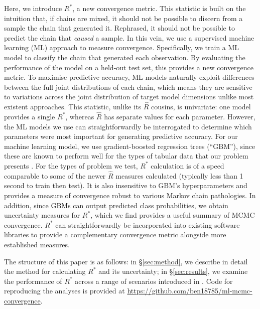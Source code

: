 \documentclass{article}
\begin{document}
Here, we introduce $R^*$, a new convergence metric. This statistic is built on the intuition that, if chains are mixed, it should not be possible to discern from a sample the chain that generated it. Rephrased, it should not be possible to predict the chain that \textit{caused} a sample. In this vein, we use a supervised machine learning (ML) approach to measure convergence. Specifically, we train a ML model to classify the chain that generated each observation. By evaluating the performance of the model on a held-out test set, this provides a new convergence metric. To maximise predictive accuracy, ML models naturally exploit differences between the full joint distributions of each chain, which means they are sensitive to variations across the joint distribution of target model dimensions unlike most existent approaches. This statistic, unlike its $\hat{R}$ cousins, is univariate: one model provides a single $R^*$, whereas $\hat{R}$ has separate values for each parameter. However, the ML models we use can straightforwardly be interrogated to determine which parameters were most important for generating predictive accuracy. For our machine learning model, we use gradient-boosted regression trees \cite{friedman2001greedy,greenwell2019package} (``GBM''), since these are known to perform well for the types of tabular data that our problem presents \cite{chollet2018}. For the types of problem we test, $R^*$ calculation is of a speed comparable to some of the newer $\hat{R}$ measures calculated (typically less than 1 second to train then test). It is also insensitive to GBM's hyperparameters and provides a measure of convergence robust to various Markov chain pathologies. In addition, since GBMs can output predicted class probabilities, we obtain uncertainty measures for $R^*$, which we find provides a useful summary of MCMC convergence. $R^*$ can straightforwardly be incorporated into existing software libraries to provide a complementary convergence metric alongside more established measures.

The structure of this paper is as follows: in \S\ref{sec:method}, we describe in detail the method for calculating $R^*$ and its uncertainty; in \S\ref{sec:results}, we examine the performance of $R^*$ across a range of scenarios introduced in \cite{vehtari2019rank}. Code for reproducing the analyses is provided at \url{https://github.com/ben18785/ml-mcmc-convergence}.

\end{document}
